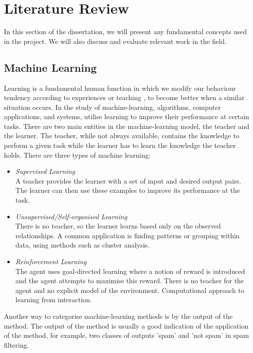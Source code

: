 \documentclass[11pt,a4paper]{article}
\begin{document}
\newpage
\section{Literature Review}
In this section of the dissertation, we will present any fundamental concepts used in the project. We will also discuss and evaluate relevant work in the field.
\subsection{Machine Learning}
Learning is a fundamental human function in which we modify our behaviour tendency according to experiences or teaching \cite{michalski}, to become better when a similar situation occurs. In the study of machine-learning, algorithms, computer applications, and systems, utilise learning to improve their performance at certain tasks. There are two main entities in the machine-learning model, the teacher and the learner. The teacher, while not always available, contains the knowledge to perform a given task while the learner has to learn the knowledge the teacher holds. \cite{swarmann} There are three types of machine learning:
\begin{itemize}
\item \emph{Supervised Learning}\\
A teacher provides the learner with a set of input and desired output pairs. The learner can then use these examples to improve its performance at the task.
\item \emph{Unsupervised/Self-organised Learning}\\
There is no teacher, so the learner learns based only on the observed relationships. A common application is finding patterns or grouping within data, using methods such as cluster analysis.
\item \emph{Reinforcement Learning}\\
The agent uses goal-directed learning where a notion of reward is introduced and the agent attempts to maximise this reward. There is no teacher for the agent and no explicit model of the environment. Computational approach to learning from interaction. \cite{reinforce}
\end{itemize}
\newpage
Another way to categorise machine-learning methods is by the output of the method. The output of the method is usually a good indication of the application of the method, for example, two classes of outputs 'spam' and 'not spam' in spam filtering. 
\end{document}
